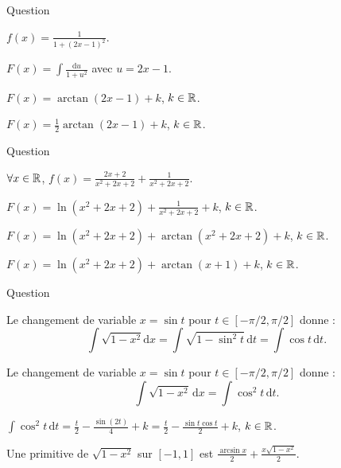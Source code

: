 \begin{multi}[multiple,feedback=
{On a : \(2+4x^2-4x=1+(2x-1)^2\) et avec \(u=2x-1\), on a : \(\mathrm{d}u=2\mathrm{d}x\) et 
\[F(x)=\frac{1}{2}\int \frac{\mathrm{d}u}{1+u^2}=\frac{1}{2}\arctan u+k=\frac{1}{2}\arctan (2x-1)+k,\; k\in \Rr.\]
}]{Question}
    \item* \(\displaystyle f(x)=\frac{1}{1+(2x-1)^2}\).
    \item \(\displaystyle F(x)=\int \frac{\mathrm{d}u}{1+u^2}\) avec \(u=2x-1\).
    \item \(\displaystyle F(x)=\arctan (2x-1)+k\), \(k\in \Rr\).
    \item* \(\displaystyle F(x)=\frac{1}{2}\arctan (2x-1)+k\),\; \(k\in \Rr\).
\end{multi}


\begin{multi}[multiple,feedback=
{L'égalité \(2x+3=(2x+2)+1\) donne : \(\displaystyle f(x)=\frac{2x+2}{x^2+2x+2}+\frac{1}{1+(x+1)^2}\). Donc, par linéarité : \(F(x)=\ln (x^2+2x+2)+\arctan (x+1)+k\) pour un \(k\in \Rr\).
}]{Question}
    \item* \(\forall x\in \mathbb{R}\), \(\displaystyle f(x)=\frac{2x+2}{x^2+2x+2}+\frac{1}{x^2+2x+2}\).
    \item \(\displaystyle F(x)=\ln (x^2+2x+2)+\frac{1}{x^2+2x+2}+k\), \(k\in \Rr\).
    \item \(\displaystyle F(x)=\ln (x^2+2x+2)+\arctan(x^2+2x+2)+k\), \(k\in \Rr\).
    \item* \(\displaystyle F(x)=\ln (x^2+2x+2)+\arctan (x+1)+k\), \(k\in \Rr\).
\end{multi}


\begin{multi}[multiple,feedback=
{Avec \(x=\sin t\), on a : \(\mathrm{d}x=\cos t\, \mathrm{d}t\) et \(\sqrt{1-x^2}=\cos t\) car \(t\in [-\pi/2,\pi/2]\). D'où
\[\int \sqrt{1-x^2}\, \mathrm{d}x=\int \cos ^2t\, \mathrm{d}t=\int \left(\frac{1}{2}+\frac{\cos (2t)}{2}\right)\mathrm{d}t=\frac{t}{2}+\frac{\sin (2t)}{4}+k,\; k\in \Rr.\]
Ainsi
\[\int \sqrt{1-x^2}\, \mathrm{d}x=\frac{t}{2}+\frac{\sin t\cos t}{2}+k=\frac{\arcsin x}{2}+\frac{x\sqrt{1-x^2}}{2}+k,\; k\in \Rr.\]
}]{Question}
    \item Le changement de variable \(x=\sin t\) pour \(t\in [-\pi/2,\pi/2]\) donne :
\[\int \sqrt{1-x^2}\mathrm{d}x=\int \sqrt{1-\sin ^2t}\, \mathrm{d}t=\int \cos t\, \mathrm{d}t.\]
    \item* Le changement de variable \(x=\sin t\) pour \(t\in [-\pi/2,\pi/2]\) donne :
\[\int \sqrt{1-x^2}\, \mathrm{d}x=\int \cos ^2t\, \mathrm{d}t.\]
    \item \(\displaystyle \int \cos ^2t\, \mathrm{d}t=\frac{t}{2}-\frac{\sin (2t)}{4}+k=\frac{t}{2}-\frac{\sin t\cos t}{2}+k\), \(k\in\Rr\).
    \item* Une primitive de \(\displaystyle \sqrt{1-x^2}\) sur \([-1,1]\) est \(\displaystyle \frac{\arcsin x}{2}+\frac{x\sqrt{1-x^2}}{2}\).
\end{multi}


